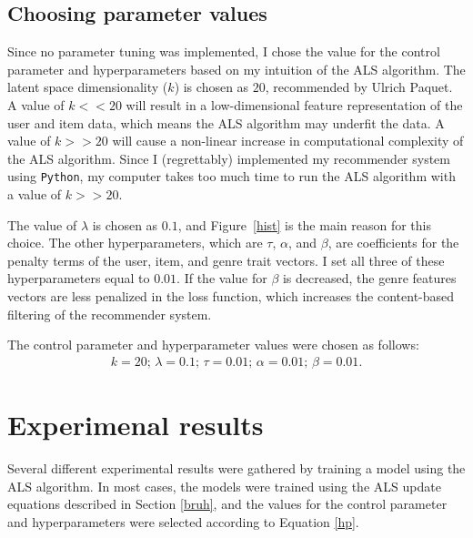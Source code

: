 \documentclass{article}
\begin{document}
\subsection{Choosing parameter values}
Since no parameter tuning was implemented, I chose the value for the control parameter and hyperparameters based on my intuition of the ALS algorithm.
The latent space dimensionality ($k$) is chosen as $20$, recommended by Ulrich Paquet. A value of $k << 20$ will result in a low-dimensional feature representation
of the user and item data, which means the ALS algorithm may underfit the data. A value of $k >> 20$ will cause a non-linear increase in computational
complexity of the ALS algorithm. Since I (regrettably) implemented my recommender system using \texttt{Python},
my computer takes too much time to run the ALS algorithm with a value of $k >> 20$.

The value of $\lambda$ is chosen as $0.1$, and Figure~\ref{hist} is the main reason for this choice. The other hyperparameters, which are
$\tau$, $\alpha$, and $\beta$, are coefficients for the penalty terms of the user, item, and genre trait vectors. I set all three of these hyperparameters
equal to $0.01$. If the value for $\beta$ is decreased, the genre features vectors are less penalized in the loss function, which increases 
the content-based filtering of the recommender system.

The control parameter and hyperparameter values were chosen as follows:
\begin{equation} \label{hp}
    \begin{split}
        k = 20\text{; }\lambda = 0.1\text{; }\tau = 0.01\text{; }\alpha = 0.01\text{; }\beta = 0.01\text{.}
    \end{split}
\end{equation}

\newpage


\section{Experimenal results}
Several different experimental results were gathered by training a model using the ALS algorithm.
In most cases, the models were trained using the ALS update equations described in Section \ref{bruh},
and the values for the control parameter and hyperparameters were selected according to Equation \ref{hp}.
\end{document}
